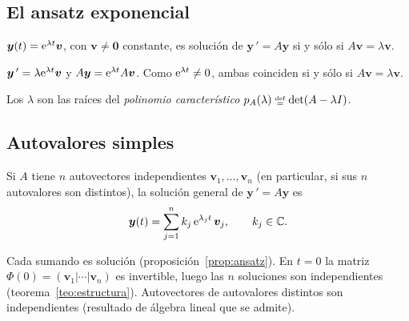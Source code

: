 \documentclass[11pt,twoside]{article}
\newcommand\vy{\bm{y}}
\newcommand\vv{\bm{v}}
\begin{document}
\subsection{El ansatz exponencial}

\begin{proposicion}\label{prop:ansatz}
$\vy(t)=\e^{\lambda t}\vv$, con $\vv\neq\bm0$ constante, es solución de $\vy\,'=A\vy$ si y sólo si $A\vv=\lambda\vv$.
\end{proposicion}

\begin{demostracion}
$\vy\,'=\lambda\e^{\lambda t}\vv$ y $A\vy=\e^{\lambda t}A\vv$. Como $\mathrm{e}^{\lambda t}\neq0$, ambas coinciden si y sólo si
$A\vv=\lambda\vv$.
\end{demostracion}

Los $\lambda$ son las raíces del \emph{polinomio característico} $p_A(\lambda)\defeq\det(A-\lambda\Id)$.

\subsection{Autovalores simples}

\begin{teorema}\label{teo:simples}
Si $A$ tiene $n$ autovectores independientes $\vv_1,\dots,\vv_n$ (en particular, si sus $n$ autovalores son
distintos), la solución general de $\vy\,'=A\vy$ es
\begin{equation}\label{eq:simples}
\vy(t)=\sum_{j=1}^{n}k_j\,\e^{\lambda_jt}\,\vv_j,\qquad k_j\in\C .
\end{equation}
\end{teorema}

\begin{demostracion}
Cada sumando es solución (proposición~\ref{prop:ansatz}). En $t=0$ la matriz $\Phi(0)=(\vv_1|\cdots|\vv_n)$ es
invertible, luego las $n$ soluciones son independientes (teorema~\ref{teo:estructura}). Autovectores de autovalores
distintos son independientes (resultado de álgebra lineal que se admite).
\end{demostracion}
\end{document}
